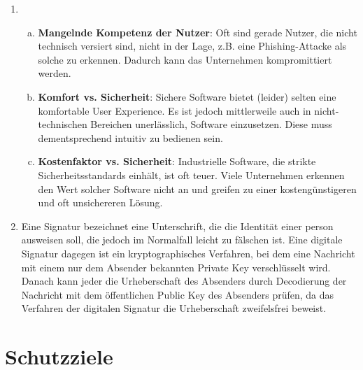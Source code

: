 \documentclass[a4paper,11pt]{scrartcl}
\begin{document}
\begin{enumerate}[1.]
    \item
        \begin{enumerate}[(a)]
            \item \textbf{Mangelnde Kompetenz der Nutzer}:
                  Oft sind gerade Nutzer, die nicht technisch versiert sind,
                  nicht in der Lage, z.B. eine Phishing-Attacke als solche zu
                  erkennen. Dadurch kann das Unternehmen kompromittiert werden.
            \item \textbf{Komfort vs. Sicherheit}:
                  Sichere Software bietet (leider) selten eine komfortable
                  User Experience. Es ist jedoch mittlerweile auch in nicht-technischen
                  Bereichen unerlässlich, Software einzusetzen. Diese muss
                  dementsprechend intuitiv zu bedienen sein.
            \item \textbf{Kostenfaktor vs. Sicherheit}:
                  Industrielle Software, die strikte Sicherheitsstandards
                  einhält, ist oft teuer. Viele Unternehmen erkennen den Wert
                  solcher Software nicht an und greifen zu einer
                  kostengünstigeren und oft unsichereren Lösung.
        \end{enumerate}
    \item Eine Signatur bezeichnet eine Unterschrift, die die Identität einer person ausweisen soll, die jedoch im Normalfall leicht zu fälschen ist. Eine digitale Signatur dagegen ist ein kryptographisches Verfahren, bei dem eine Nachricht mit einem nur dem Absender bekannten Private Key verschlüsselt wird. Danach kann jeder die Urheberschaft des Absenders durch Decodierung der Nachricht mit dem öffentlichen Public Key des Absenders prüfen, da das Verfahren der digitalen Signatur die Urheberschaft zweifelsfrei beweist.
\end{enumerate}

\section{Schutzziele}
\end{document}
